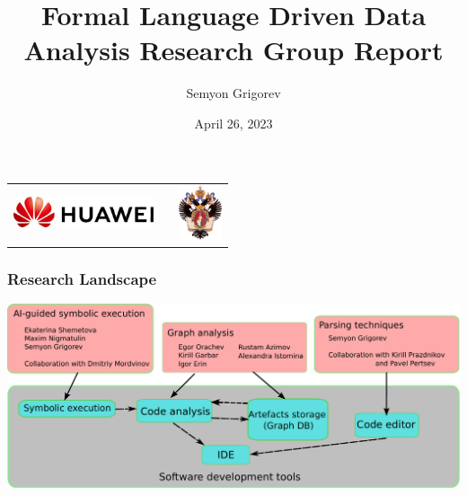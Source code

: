 \documentclass[xcolor=table,aspectratio=169]{beamer}
\title[FLDDA Research Group Report]{Formal Language Driven Data Analysis Research Group Report}
\institute[SPbSU]{
Saint Petersburg State University
}
\author[Semyon Grigorev]{Semyon Grigorev}
\date{April 26, 2023}
\begin{document}
{
\begin{frame}[fragile]
  \begin{table}
  \centering
  \begin{tabularx}{\linewidth}{XcX}
    \includegraphics[height=0.9cm]{pictures/hu_logo.jpeg} \hfill
    & 
    & \hfill \includegraphics[height=1.6cm]{pictures/SPbGU_Logo.png}
  \end{tabularx}
  \end{table}
  \titlepage
\end{frame}
}

\begin{frame}[fragile]
  \frametitle{Research Landscape}  
  \begin{center}
    \includegraphics[width=\textwidth]{pictures/landscape.pdf}
  \end{center} 
\end{frame}
\end{document}
